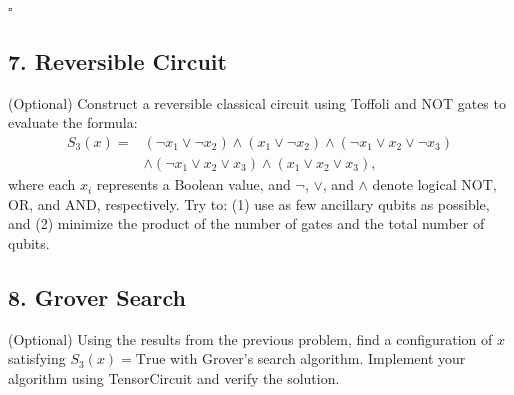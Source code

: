 \documentclass{ctexart}
\begin{document}
\hfill $\square$

\subsection*{7. Reversible Circuit}
(Optional) Construct a reversible classical circuit using Toffoli and NOT gates to evaluate the formula:
\begin{align*}
    S_3(x) = &(\neg x_1 \lor \neg x_2) \land (x_1 \lor \neg x_2) \land (\neg x_1 \lor x_2 \lor \neg x_3) \\
             &\land (\neg x_1 \lor x_2 \lor x_3) \land (x_1 \lor x_2 \lor x_3),
\end{align*}
where each $x_i$ represents a Boolean value, and $\neg$, $\lor$, and $\land$ denote logical NOT, OR, and AND, respectively. Try to: (1) use as few ancillary qubits as possible, and (2) minimize the product of the number of gates and the total number of qubits.

\subsection*{8. Grover Search}
(Optional) Using the results from the previous problem, find a configuration of $x$ satisfying $S_3(x) = \text{True}$ with Grover's search algorithm. Implement your algorithm using TensorCircuit and verify the solution.
\end{document}
